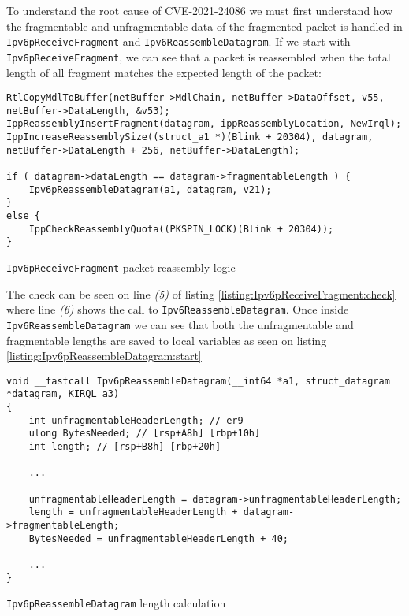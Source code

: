 \documentclass{report}
\begin{document}
To understand the root cause of CVE-2021-24086 we must first understand how the fragmentable and unfragmentable data of the fragmented packet is handled in \texttt{Ipv6pReceiveFragment} and \texttt{Ipv6ReassembleDatagram}. If we start with \texttt{Ipv6pReceiveFragment}, we can see that a packet is reassembled when the total length of all fragment matches the expected length of the packet:

\begin{listing}[H]
\begin{verbatim}
RtlCopyMdlToBuffer(netBuffer->MdlChain, netBuffer->DataOffset, v55, netBuffer->DataLength, &v53);
IppReassemblyInsertFragment(datagram, ippReassemblyLocation, NewIrql);
IppIncreaseReassemblySize((struct_a1 *)(Blink + 20304), datagram, netBuffer->DataLength + 256, netBuffer->DataLength);

if ( datagram->dataLength == datagram->fragmentableLength ) {
    Ipv6pReassembleDatagram(a1, datagram, v21);
}
else {
    IppCheckReassemblyQuota((PKSPIN_LOCK)(Blink + 20304));
}
\end{verbatim}
\caption{\texttt{Ipv6pReceiveFragment} packet reassembly logic}
\label{listing:Ipv6pReceiveFragment:check}
\end{listing}

The check can be seen on line \emph{(5)} of listing \ref{listing:Ipv6pReceiveFragment:check} where line \emph{(6)} shows the call to \texttt{Ipv6ReassembleDatagram}. Once inside \texttt{Ipv6ReassembleDatagram} we can see that both the unfragmentable and fragmentable lengths are saved to local variables as seen on listing \ref{listing:Ipv6pReassembleDatagram:start}

\begin{listing}[H]
\begin{verbatim}
void __fastcall Ipv6pReassembleDatagram(__int64 *a1, struct_datagram *datagram, KIRQL a3)
{
    int unfragmentableHeaderLength; // er9
    ulong BytesNeeded; // [rsp+A8h] [rbp+10h]
    int length; // [rsp+B8h] [rbp+20h]

    ...

    unfragmentableHeaderLength = datagram->unfragmentableHeaderLength;
    length = unfragmentableHeaderLength + datagram->fragmentableLength;
    BytesNeeded = unfragmentableHeaderLength + 40;

    ...
}
\end{verbatim}
\caption{\texttt{Ipv6pReassembleDatagram} length calculation}
\label{listing:Ipv6pReassembleDatagram:start}
\end{listing}
\end{document}
